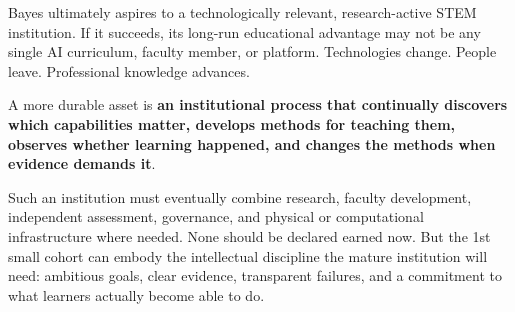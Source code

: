 Bayes ultimately aspires to a technologically relevant, research-active STEM institution. If it succeeds, its long-run educational advantage may not be any single AI curriculum, faculty member, or platform. Technologies change. People leave. Professional knowledge advances.

A more durable asset is \textbf{an institutional process that continually discovers which capabilities matter, develops methods for teaching them, observes whether learning happened, and changes the methods when evidence demands it}.

Such an institution must eventually combine research, faculty development, independent assessment, governance, and physical or computational infrastructure where needed. None should be declared earned now. But the 1st small cohort can embody the intellectual discipline the mature institution will need: ambitious goals, clear evidence, transparent failures, and a commitment to what learners actually become able to do.
